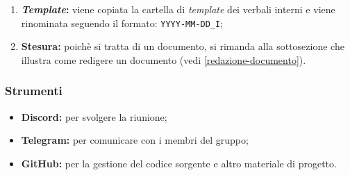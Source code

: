 \begin{itemize}
\begin{enumerate}
			\item \textbf{\textit{Template}:} viene copiata la cartella di \textit{template} dei
					verbali interni e viene rinominata
					seguendo il formato: \texttt{YYYY-MM-DD\_I};

			\item \textbf{Stesura:} poichè si tratta di un documento, si
					rimanda alla sottosezione che illustra come redigere un
					documento (vedi \cref{redazione-documento}).
		\end{enumerate}
\end{itemize}

\subsubsection*{Strumenti}
\begin{itemize}
	\item \textbf{Discord\g:} per svolgere la riunione;
	\item \textbf{Telegram\g:} per comunicare con i membri del gruppo;
	\item \textbf{GitHub\g:} per la gestione del codice sorgente e altro
		materiale di progetto.
\end{itemize}